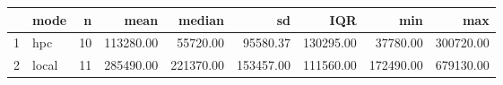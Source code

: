 \begin{table}[ht]
\centering
\begin{tabular}{rlrrrrrrr}
  \hline
 & mode & n & mean & median & sd & IQR & min & max \\ 
  \hline
1 & hpc &  10 & 113280.00 & 55720.00 & 95580.37 & 130295.00 & 37780.00 & 300720.00 \\ 
  2 & local &  11 & 285490.00 & 221370.00 & 153457.00 & 111560.00 & 172490.00 & 679130.00 \\ 
   \hline
\end{tabular}
\end{table}
